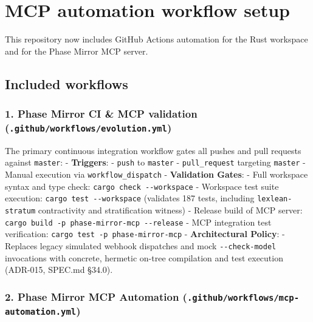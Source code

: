 \documentclass[
]{article}
\begin{document}
\hypertarget{mcp-automation-workflow-setup}{%
\section{MCP automation workflow
setup}\label{mcp-automation-workflow-setup}}

This repository now includes GitHub Actions automation for the Rust
workspace and for the Phase Mirror MCP server.

\hypertarget{included-workflows}{%
\subsection{Included workflows}\label{included-workflows}}

\hypertarget{phase-mirror-ci-mcp-validation-.githubworkflowsevolution.yml}{%
\subsubsection{\texorpdfstring{1. Phase Mirror CI \& MCP validation
(\texttt{.github/workflows/evolution.yml})}{1. Phase Mirror CI \& MCP validation (.github/workflows/evolution.yml)}}\label{phase-mirror-ci-mcp-validation-.githubworkflowsevolution.yml}}

The primary continuous integration workflow gates all pushes and pull
requests against \texttt{master}: - \textbf{Triggers}: - \texttt{push}
to \texttt{master} - \texttt{pull\_request} targeting \texttt{master} -
Manual execution via \texttt{workflow\_dispatch} - \textbf{Validation
Gates}: - Full workspace syntax and type check:
\texttt{cargo\ check\ -\/-workspace} - Workspace test suite execution:
\texttt{cargo\ test\ -\/-workspace} (validates 187 tests, including
\texttt{lexlean-stratum} contractivity and stratification witness) -
Release build of MCP server:
\texttt{cargo\ build\ -p\ phase-mirror-mcp\ -\/-release} - MCP
integration test verification:
\texttt{cargo\ test\ -p\ phase-mirror-mcp} - \textbf{Architectural
Policy}: - Replaces legacy simulated webhook dispatches and mock
\texttt{-\/-check-model} invocations with concrete, hermetic on-tree
compilation and test execution (ADR-015, SPEC.md §34.0).

\hypertarget{phase-mirror-mcp-automation-.githubworkflowsmcp-automation.yml}{%
\subsubsection{\texorpdfstring{2. Phase Mirror MCP Automation
(\texttt{.github/workflows/mcp-automation.yml})}{2. Phase Mirror MCP Automation (.github/workflows/mcp-automation.yml)}}\label{phase-mirror-mcp-automation-.githubworkflowsmcp-automation.yml}}
\end{document}
